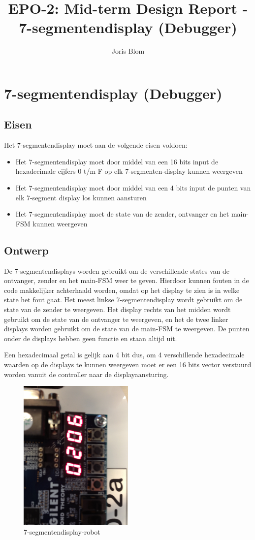 \documentclass{report}
\title{EPO-2: Mid-term Design Report - 7-segmentendisplay (Debugger)}
\author{Joris Blom}
\begin{document}
\chapter{7-segmentendisplay (Debugger)}
\label{ch:sseg}
\section{Eisen}
\label{sec:Eisen}
Het 7-segmentendisplay moet aan de volgende eisen voldoen: 
\begin{itemize}
\item Het 7-segmentendisplay moet door middel van een 16 bits input de hexadecimale cijfers 0 t/m F op elk 7-segmenten-display kunnen weergeven
\item Het 7-segmentendisplay moet door middel van een 4 bits input de punten van elk 7-segment display los kunnen aansturen
\item Het 7-segmentendisplay moet de state van de zender, ontvanger en het main-FSM kunnen weergeven
\end{itemize}

\section{Ontwerp}
De 7-segmentendisplays worden gebruikt om de verschillende states van de ontvanger, zender en het main-FSM weer te geven. Hierdoor kunnen fouten in de code makkelijker achterhaald worden, omdat op het display te zien is in welke state het fout gaat.
Het meest linkse 7-segmentendisplay wordt gebruikt om de state van de zender te weergeven.
Het display rechts van het midden wordt gebruikt om de state van de ontvanger te weergeven, en het de twee linker displays worden gebruikt om de state van de main-FSM te weergeven.
De punten onder de displays hebben geen functie en staan altijd uit.

Een hexadecimaal getal is gelijk aan 4 bit dus, om 4 verschillende hexadecimale waarden op de displays te kunnen weergeven moet er een 16 bits vector verstuurd worden vanuit de controller naar de displayaansturing.

\begin{figure}[H]
\centering
\includegraphics[width=0.5\textwidth]{7_segment_display-robot.jpg}

\caption{7-segmentendisplay-robot}
\end{figure}
\end{document}
